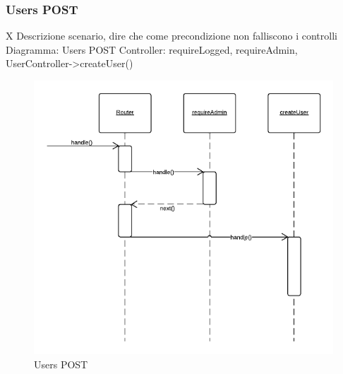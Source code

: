 \subsubsection{Users POST} X
Descrizione scenario, dire che come precondizione non falliscono i controlli
Diagramma: Users POST
Controller: requireLogged, requireAdmin, UserController->createUser()
\begin{figure}[H]
	\begin{center} 
		\includegraphics[scale=0.60]{scenari/Users POST.png} 
		\caption{Users POST}
	\end{center} 
\end{figure}

